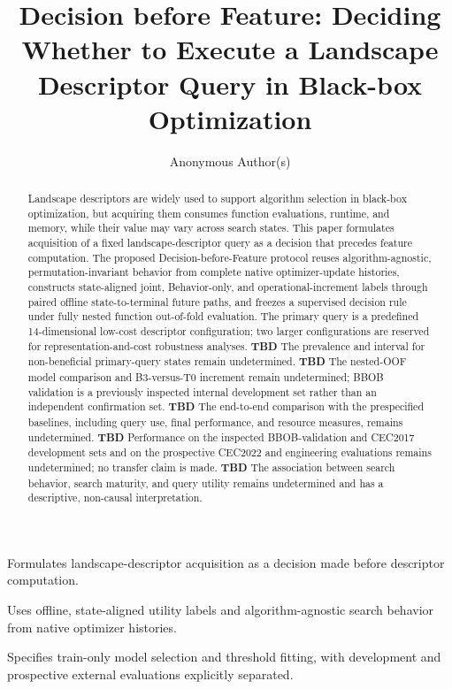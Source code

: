 \documentclass[a4paper,fleqn]{cas-dc}
\newcommand{\TBD}[1]{\textcolor{red!70!black}{\textbf{TBD}}}
\newcommand{\DBF}{Decision-before-Feature}
\begin{document}
\let\WriteBookmarks\relax
\def\floatpagepagefraction{1}
\def\textpagefraction{.001}


\title[mode=title]{Decision before Feature: Deciding Whether to Execute a
Landscape Descriptor Query in Black-box Optimization}

\author[1]{Anonymous Author(s)}

\begin{abstract}
Landscape descriptors are widely used to support algorithm selection in
black-box optimization, but acquiring them consumes function evaluations,
runtime, and memory, while their value may vary across search states.  This
paper formulates acquisition of a fixed landscape-descriptor query as a
decision that precedes feature computation.  The proposed \DBF{} protocol
reuses algorithm-agnostic,
permutation-invariant behavior from complete native optimizer-update histories,
constructs state-aligned joint, Behavior-only, and operational-increment labels
through paired offline state-to-terminal future paths, and freezes a supervised decision rule
under fully nested function out-of-fold evaluation.  The primary query is a
predefined 14-dimensional low-cost descriptor configuration; two larger
configurations are reserved for representation-and-cost robustness analyses.
\TBD{TBD-ABS-RQ1}
The prevalence and interval for non-beneficial primary-query states remain
undetermined.
\TBD{TBD-ABS-RQ2}
The nested-OOF model comparison and B3-versus-T0 increment remain
undetermined; BBOB validation is a previously inspected internal development
set rather than an independent confirmation set.
\TBD{TBD-ABS-RQ3}
The end-to-end comparison with the prespecified baselines, including query
use, final performance, and resource measures, remains undetermined.
\TBD{TBD-ABS-RQ4}
Performance on the inspected BBOB-validation and CEC2017 development sets and
on the prospective CEC2022 and engineering evaluations remains undetermined;
no transfer claim is made.
\TBD{TBD-ABS-RQ5}
The association between search behavior, search maturity, and query utility
remains undetermined and has a descriptive, non-causal interpretation.
\end{abstract}

\begin{highlights}
\item Formulates landscape-descriptor acquisition as a decision made before
      descriptor computation.
\item Uses offline, state-aligned utility labels and algorithm-agnostic search
      behavior from native optimizer histories.
\item Specifies train-only model selection and threshold fitting, with
      development and prospective external evaluations explicitly separated.
\end{highlights}
\end{document}
